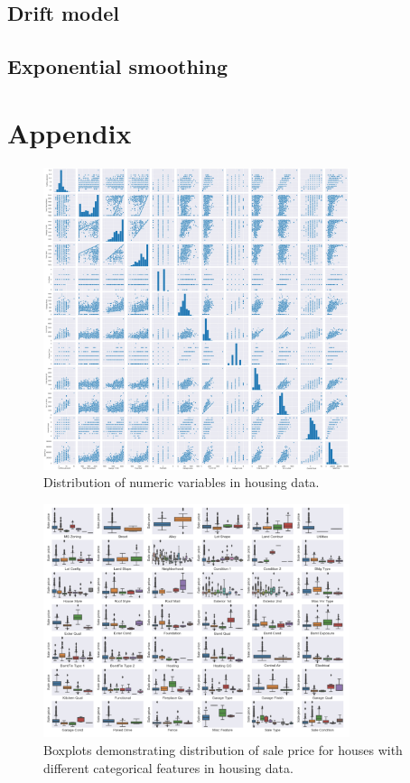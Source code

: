 \documentclass[letterpaper,12pt,twoside,]{pinp}
\begin{document}
\hypertarget{drift-model}{%
\subsection{Drift model}\label{drift-model}}

\hypertarget{exponential-smoothing}{%
\subsection{Exponential smoothing}\label{exponential-smoothing}}

\hypertarget{appendix}{%
\section{Appendix}\label{appendix}}

\begin{figure}
\includegraphics[width=0.8\textwidth]{scatter.png}
\centering
\caption{Distribution of numeric variables in housing data.}
\label{fig:scatter}
\end{figure}

\begin{figure}
\includegraphics[width=0.8\textwidth]{boxplot.png}
\centering
\caption{Boxplots demonstrating distribution of sale price for houses with different categorical features in housing data.}
\label{fig:boxplots}
\end{figure}





\end{document}
